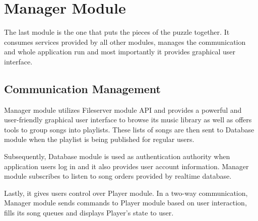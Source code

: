 \section {Manager Module}

The last module is the one that puts the pieces of the puzzle together. It consumes services provided by all other modules, manages the communication and whole application run and most importantly it provides graphical user interface.

\subsection {Communication Management}

Manager module utilizes Fileserver module API and provides a powerful and user-friendly graphical user interface to browse its music library as well as offers tools to group songs into playlists. These lists of songs are then sent to Database module when the playlist is being published for regular users.
\par
Subsequently, Database module is used as authentication authority when application users log in and it also provides user account information. Manager module subscribes to listen to song orders provided by realtime database.
\par
Lastly, it gives users control over Player module. In a two-way communication, Manager module sends commands to Player module based on user interaction, fills its song queues and displays Player's state to user.